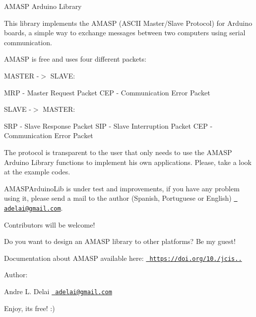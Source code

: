 A\+M\+A\+SP Arduino Library

This library implements the A\+M\+A\+SP (A\+S\+C\+II Master/\+Slave Protocol) for Arduino boards, a simple way to exchange messages between two computers using serial communication.

A\+M\+A\+SP is free and uses four different packets\+:

M\+A\+S\+T\+ER -\/$>$ S\+L\+A\+VE\+:

M\+RP -\/ Master Request Packet C\+EP -\/ Communication Error Packet

S\+L\+A\+VE -\/$>$ M\+A\+S\+T\+ER\+:

S\+RP -\/ Slave Response Packet S\+IP -\/ Slave Interruption Packet C\+EP -\/ Communication Error Packet

The protocol is transparent to the user that only needs to use the A\+M\+A\+SP Arduino Library functions to implement his own applications. Please, take a look at the example codes.

A\+M\+A\+S\+P\+Arduino\+Lib is under test and improvements, if you have any problem using it, please send a mail to the author (Spanish, Portuguese or English) \href{mailto:adelai@gmail.com}{\texttt{ adelai@gmail.\+com}}.

Contributors will be welcome!

Do you want to design an A\+M\+A\+SP library to other platforms? Be my guest!

Documentation about A\+M\+A\+SP available here\+: \href{https://doi.org/10.14209/jcis.2019.1}{\texttt{ https\+://doi.\+org/10./jcis..}}

Author\+:

Andre L. Delai \href{mailto:adelai@gmail.com}{\texttt{ adelai@gmail.\+com}}

Enjoy, it\textquotesingle{}s free! \+:) 